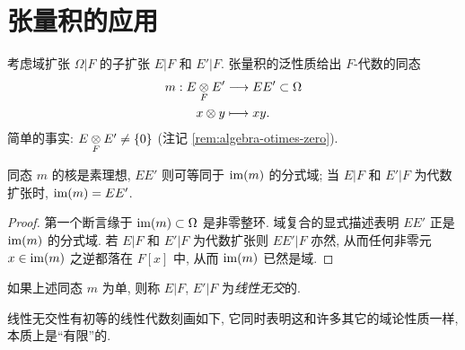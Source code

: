 \section{张量积的应用}\label{sec:tensor-field}
考虑域扩张 $\Omega|F$ 的子扩张 $E|F$ 和 $E'|F$. 张量积的泛性质给出 $F$-代数的同态
\begin{align*}
	m: E \underset{F}{\otimes} E' & \longrightarrow EE' \subset \Omega \\
	x \otimes y & \longmapsto xy.
\end{align*}
简单的事实: $E \underset{F}{\otimes} E' \neq \{0\}$ (注记 \ref{rem:algebra-otimes-zero}).

\begin{lemma}
	同态 $m$ 的核是素理想, $EE'$ 则可等同于 $\operatorname{im}(m)$ 的分式域; 当 $E|F$ 和 $E'|F$ 为代数扩张时, $\operatorname{im}(m)=EE'$.
\end{lemma}
\begin{proof}
	第一个断言缘于 $\operatorname{im}(m) \subset \Omega$ 是非零整环. 域复合的显式描述表明 $EE'$ 正是 $\operatorname{im}(m)$ 的分式域. 若 $E|F$ 和 $E'|F$ 为代数扩张则 $EE'|F$ 亦然, 从而任何非零元 $x \in \operatorname{im}(m)$ 之逆都落在 $F[x]$ 中, 从而 $\operatorname{im}(m)$ 已然是域.
\end{proof}

\begin{definition}
	如果上述同态 $m$ 为单, 则称 $E|F$, $E'|F$ 为\emph{线性无交}的.
\end{definition}
线性无交性有初等的线性代数刻画如下, 它同时表明这和许多其它的域论性质一样, 本质上是``有限''的.

